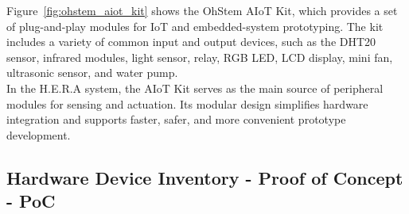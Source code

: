 Figure~\ref{fig:ohstem_aiot_kit} shows the OhStem AIoT Kit, which provides a set of plug-and-play modules for IoT and embedded-system prototyping. The kit includes a variety of common input and output devices, such as the DHT20 sensor, infrared modules, light sensor, relay, RGB LED, LCD display, mini fan, ultrasonic sensor, and water pump. \\

In the H.E.R.A system, the AIoT Kit serves as the main source of peripheral modules for sensing and actuation. Its modular design simplifies hardware integration and supports faster, safer, and more convenient prototype development.





\newpage
\subsection{Hardware Device Inventory - Proof of Concept - PoC}


